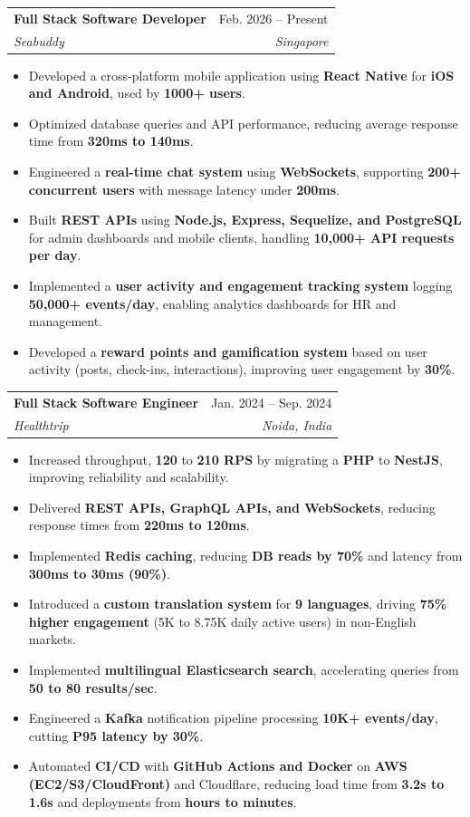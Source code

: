 \documentclass[letterpaper,11pt]{article}
\makeatletter
\newcommand{\resumeItem}[1]{
  \item\small{
    {#1 \vspace{-2pt}}
  }
}
\newcommand{\resumeSubheading}[4]{
  \vspace{-2pt}\item
    \begin{tabular*}{0.97\textwidth}[t]{l@{\extracolsep{\fill}}r}
      \textbf{#1} & #2 \\
      \textit{\small#3} & \textit{\small #4} \\
    \end{tabular*}
}
\newcommand{\resumeItemListStart}{\begin{itemize}}
\newcommand{\resumeItemListEnd}{\end{itemize}\vspace{-5pt}}
\makeatother
\begin{document}
\resumeSubheading
{Full Stack Software Developer}{Feb. 2026 -- Present}
{Seabuddy}{Singapore}
\resumeItemListStart
\resumeItem{Developed a cross-platform mobile application using \textbf{React Native} for \textbf{iOS and Android}, used by \textbf{1000+ users}.}
\resumeItem{Optimized database queries and API performance, reducing average response time from \textbf{320ms to 140ms}.}
\resumeItem{Engineered a \textbf{real-time chat system} using \textbf{WebSockets}, supporting \textbf{200+ concurrent users} with message latency under \textbf{200ms}.}
\resumeItem{Built \textbf{REST APIs} using \textbf{Node.js, Express, Sequelize, and PostgreSQL} for admin dashboards and mobile clients, handling \textbf{10,000+ API requests per day}.}
\resumeItem{Implemented a \textbf{user activity and engagement tracking system} logging \textbf{50,000+ events/day}, enabling analytics dashboards for HR and management.}
\resumeItem{Developed a \textbf{reward points and gamification system} based on user activity (posts, check-ins, interactions), improving user engagement by \textbf{30\%}.}
\resumeItemListEnd

\resumeSubheading
{Full Stack Software Engineer}{Jan. 2024 -- Sep. 2024}
{Healthtrip}{Noida, India}
\resumeItemListStart
\resumeItem{Increased throughput, \textbf{120} to \textbf{210 RPS} by migrating a \textbf{PHP} to \textbf{NestJS}, improving reliability and scalability.}
\resumeItem{Delivered \textbf{REST APIs, GraphQL APIs, and WebSockets}, reducing response times from \textbf{220ms to 120ms}.}
\resumeItem{Implemented \textbf{Redis caching}, reducing \textbf{DB reads by 70\%} and latency from \textbf{300ms to 30ms (90\%)}.}
\resumeItem{Introduced a \textbf{custom translation system} for \textbf{9 languages}, driving \textbf{75\% higher engagement} (5K to 8.75K daily active users) in non-English markets.}
\resumeItem{Implemented \textbf{multilingual Elasticsearch search}, accelerating queries from \textbf{50 to 80 results/sec}.}
\resumeItem{Engineered a \textbf{Kafka} notification pipeline processing \textbf{10K+ events/day}, cutting \textbf{P95 latency by 30\%}.}
\resumeItem{Automated \textbf{CI/CD} with \textbf{GitHub Actions and Docker} on \textbf{AWS (EC2/S3/CloudFront)} and Cloudflare, reducing load time from \textbf{3.2s to 1.6s} and deployments from \textbf{hours to minutes}.}
\resumeItemListEnd
\end{document}
